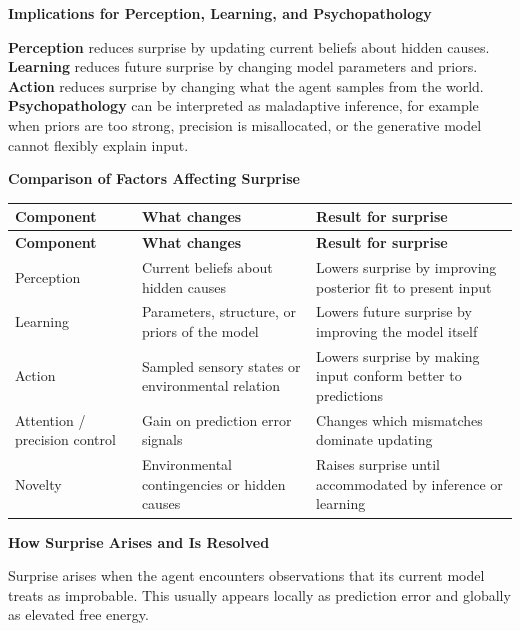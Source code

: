 \documentclass{book}
\providecommand{\ProjectDeepHeading}[2]{%
    \par\medskip\noindent\textbf{#2}\par\smallskip
}
\begin{document}
    
    \ProjectDeepHeading{11}{Implications for Perception, Learning, and Psychopathology}
        \textbf{Perception} reduces surprise by updating current beliefs about hidden causes.\newline
        \textbf{Learning} reduces future surprise by changing model parameters and priors.\newline
        \textbf{Action} reduces surprise by changing what the agent samples from the world.\newline
        \textbf{Psychopathology} can be interpreted as maladaptive inference, for example when priors are too strong, precision is misallocated, or the generative model cannot flexibly explain input.
    
    
    \ProjectDeepHeading{11}{Comparison of Factors Affecting Surprise}
        \begin{longtable}{>{\raggedright\arraybackslash}p{3.0cm} >{\raggedright\arraybackslash}p{5.0cm} >{\raggedright\arraybackslash}p{5.2cm}}
            \toprule
            \rowcolor{gray!15}
            \textbf{Component} & \textbf{What changes} & \textbf{Result for surprise} \\
            \midrule
            \endfirsthead
            \toprule
            \rowcolor{gray!15}
            \textbf{Component} & \textbf{What changes} & \textbf{Result for surprise} \\
            \midrule
            \endhead
            Perception & Current beliefs about hidden causes & Lowers surprise by improving posterior fit to present input \\
            Learning & Parameters, structure, or priors of the model & Lowers future surprise by improving the model itself \\
            Action & Sampled sensory states or environmental relation & Lowers surprise by making input conform better to predictions \\
            Attention / precision control & Gain on prediction error signals & Changes which mismatches dominate updating \\
            Novelty & Environmental contingencies or hidden causes & Raises surprise until accommodated by inference or learning \\
            \bottomrule
        \end{longtable}
    
    
    \ProjectDeepHeading{11}{How Surprise Arises and Is Resolved}
        Surprise arises when the agent encounters observations that its current model treats as improbable. This usually appears locally as prediction error and globally as elevated free energy.
        
\end{document}
